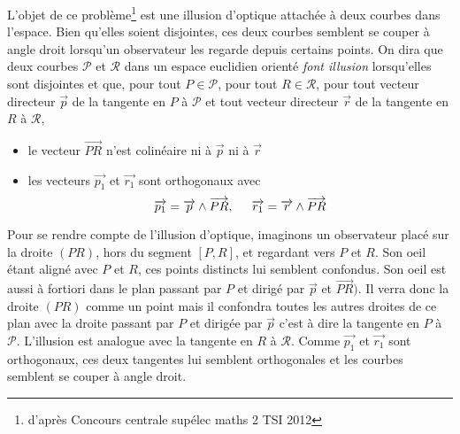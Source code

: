 L'objet de ce problème\footnote{d'après Concours centrale supélec maths 2 TSI 2012} est une illusion d'optique attachée à deux courbes dans l'espace. Bien qu'elles soient disjointes, ces deux courbes semblent se couper à angle droit lorsqu'un observateur les regarde depuis certains points.\newline
On dira que deux courbes $\mathcal{P}$ et $\mathcal{R}$ dans un espace euclidien orienté \emph{font illusion} lorsqu'elles sont disjointes et que, pour tout $P\in\mathcal{P}$, pour tout $R\in \mathcal{R}$, pour tout vecteur directeur $\overrightarrow p$ de la tangente en $P$ à $\mathcal{P}$ et tout vecteur directeur $\overrightarrow r$ de la tangente en $R$ à $\mathcal{R}$,
\begin{itemize}
 \item  le vecteur $\overrightarrow{PR}$ n'est colinéaire ni à $\overrightarrow p$ ni à $\overrightarrow r$
 \item les vecteurs $\overrightarrow{p_1}$ et $\overrightarrow{r_1}$ sont orthogonaux avec
\begin{displaymath}
 \overrightarrow{p_1} = \overrightarrow{p}\wedge \overrightarrow{PR},\hspace{0.5cm}
 \overrightarrow{r_1} = \overrightarrow{r}\wedge \overrightarrow{PR}
\end{displaymath}
\end{itemize}
Pour se rendre compte de l'illusion d'optique, imaginons un observateur placé sur la droite $(PR)$, hors du segment $[P,R]$, et regardant vers $P$ et $R$.\newline
Son oeil étant aligné avec $P$ et $R$, ces points distincts lui semblent confondus. Son oeil est aussi à fortiori dans le plan passant par $P$ et dirigé par $\overrightarrow{p}$ et $\overrightarrow{PR})$. Il verra donc la droite $(PR)$ comme un point mais il confondra toutes les autres droites de ce plan avec la droite passant par $P$ et dirigée par $\overrightarrow p$ c'est à dire la tangente en $P$ à $\mathcal{P}$.  L'illusion est analogue avec la tangente en $R$ à $\mathcal{R}$. Comme $\overrightarrow{p_1}$ et $\overrightarrow{r_1}$ sont orthogonaux, ces deux tangentes lui semblent orthogonales et les courbes semblent se couper à angle droit.

